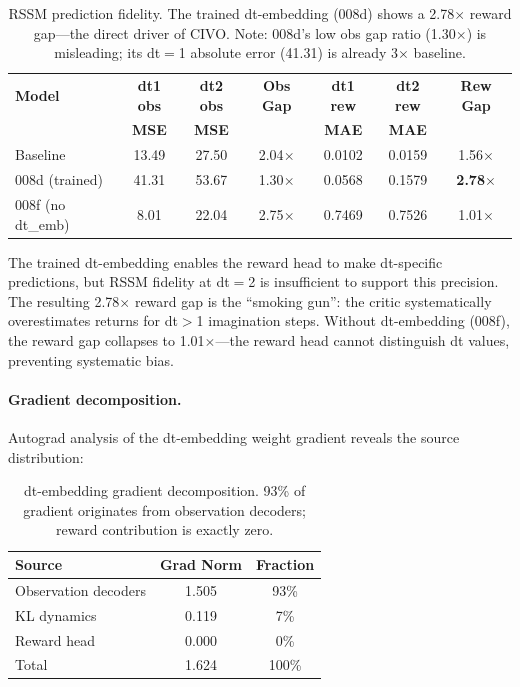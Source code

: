 \documentclass[10pt,letterpaper]{article}
\begin{document}
\begin{table}[h]
\centering
\caption{RSSM prediction fidelity. The trained dt-embedding (008d) shows a 2.78$\times$ reward gap---the direct driver of CIVO. Note: 008d's low obs gap ratio (1.30$\times$) is misleading; its dt$=$1 absolute error (41.31) is already 3$\times$ baseline.}
\label{tab:rssm}
\begin{tabular}{lcccccc}
\toprule
\textbf{Model} & \textbf{dt1 obs} & \textbf{dt2 obs} & \textbf{Obs Gap} & \textbf{dt1 rew} & \textbf{dt2 rew} & \textbf{Rew Gap} \\
 & \textbf{MSE} & \textbf{MSE} & & \textbf{MAE} & \textbf{MAE} & \\
\midrule
Baseline & 13.49 & 27.50 & 2.04$\times$ & 0.0102 & 0.0159 & 1.56$\times$ \\
008d (trained) & 41.31 & 53.67 & 1.30$\times$ & 0.0568 & 0.1579 & \textbf{2.78$\times$} \\
008f (no dt\_emb) & 8.01 & 22.04 & 2.75$\times$ & 0.7469 & 0.7526 & 1.01$\times$ \\
\bottomrule
\end{tabular}
\end{table}

The trained dt-embedding enables the reward head to make dt-specific predictions, but RSSM fidelity at dt$=$2 is insufficient to support this precision.
The resulting 2.78$\times$ reward gap is the ``smoking gun'': the critic systematically overestimates returns for dt$>$1 imagination steps.
Without dt-embedding (008f), the reward gap collapses to 1.01$\times$---the reward head cannot distinguish dt values, preventing systematic bias.

\paragraph{Gradient decomposition.}
Autograd analysis of the dt-embedding weight gradient reveals the source distribution:

\begin{table}[h]
\centering
\caption{dt-embedding gradient decomposition. 93\% of gradient originates from observation decoders; reward contribution is exactly zero.}
\label{tab:grad}
\begin{tabular}{lcc}
\toprule
\textbf{Source} & \textbf{Grad Norm} & \textbf{Fraction} \\
\midrule
Observation decoders & 1.505 & 93\% \\
KL dynamics & 0.119 & 7\% \\
Reward head & 0.000 & 0\% \\
\midrule
Total & 1.624 & 100\% \\
\bottomrule
\end{tabular}
\end{table}
\end{document}
